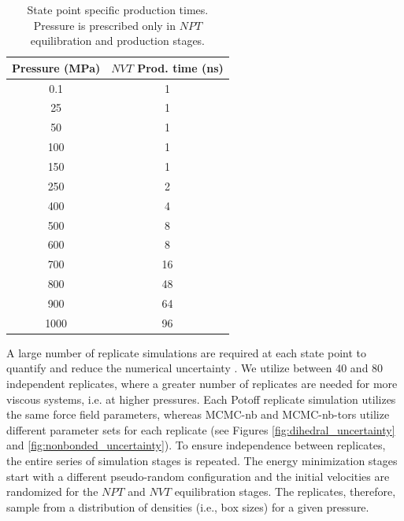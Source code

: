 \documentclass[preprint,review,12pt]{elsarticle}
\begin{document}
	\begin{table}[htb!]
		\caption{State point specific production times. Pressure is prescribed only in $NPT$ equilibration and production stages.} \label{tab:production times}
		\begin{center}
			\begin{tabular}{|c|c|}
				\hline
				Pressure (MPa) & $NVT$ Prod. time (ns) \\ \hline
				0.1 & 1 \\
				25 & 1 \\
				50 & 1 \\
				100 & 1 \\			     
				150 & 1 \\
				250 & 2 \\
				400 & 4 \\
				500 & 8 \\
				600 & 8 \\			     
				700 & 16 \\
				800 & 48 \\
				900 & 64 \\
				1000 & 96 \\
				\hline        
			\end{tabular}
		\end{center}
	\end{table}
	
	A large number of replicate simulations are required at each state point to quantify and reduce the numerical uncertainty \cite{Maginn2018,Zhang2015}. We utilize between 40 and 80 independent replicates, where a greater number of replicates are needed for more viscous systems, i.e. at higher pressures. Each Potoff replicate simulation utilizes the same force field parameters, whereas MCMC-nb and MCMC-nb-tors utilize different parameter sets for each replicate (see Figures \ref{fig:dihedral_uncertainty} and \ref{fig:nonbonded_uncertainty}). To ensure independence between replicates, the entire series of simulation stages is repeated. The energy minimization stages start with a different pseudo-random configuration and the initial velocities are randomized for the $NPT$ and $NVT$ equilibration stages. The replicates, therefore, sample from a distribution of densities (i.e., box sizes) for a given pressure. 
	
	
	
\end{document}
